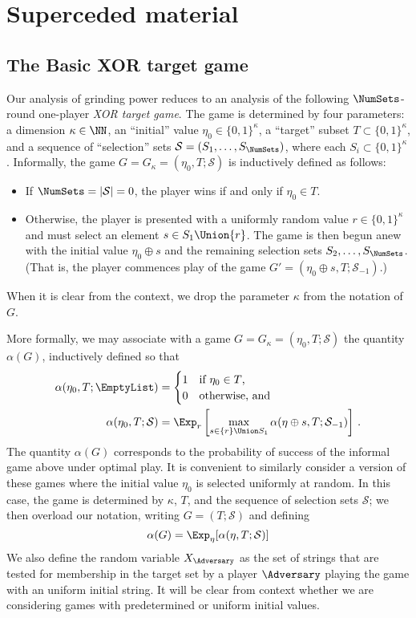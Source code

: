 
\section{Superceded material}


\subsection{The Basic XOR target game}\label{sec:generic-xor-game}


Our analysis of grinding power reduces to an analysis of the following
$\NumSets$-round one-player \emph{XOR target game}. 
The game is determined by four parameters: 
a dimension $\kappa \in \NN$, 
an ``initial'' value $\eta_0 \in \{0,1\}^\kappa$, 
a ``target'' subset $T \subset \{0,1\}^\kappa$, 
and a sequence of ``selection'' sets $\mathcal{S} = (S_1, \ldots, S_\NumSets)$, where each
$S_i \subset \{0,1\}^\kappa$. 
Informally, the game $G = G_\kappa = (\eta_0, T;  \mathcal{S})$ is
inductively defined as follows:
\begin{itemize}
\item If $\NumSets = |\mathcal{S}| = 0$, the player wins if and only if $\eta_0 \in T$.
\item Otherwise, the player is
  presented with a uniformly random value $r \in \{0,1\}^\kappa$ and must
  select an element $s \in S_1 \Union \{r\}$. The game is then
  begun anew with the initial value $\eta_0 \oplus s$ and the remaining
  selection sets $S_2, \ldots, S_\NumSets$. (That is, the player
  commences play of the game
  $G' = (\eta_0 \oplus s, T; \mathcal{S}_{-1})$.)
\end{itemize}
When it is clear from the context, we drop the parameter $\kappa$ from the notation of $G$.

More formally, we may associate with a game $G = G_\kappa = (\eta_0, T;  \mathcal{S})$ 
the quantity $\alpha(G)$, inductively defined so that
\begin{align*}
  \alpha(\eta_0, T;  \EmptyList) &= \begin{cases} 1 & \text{if $\eta_0 \in T$,}\\
    0 & \text{otherwise, and}
  \end{cases}\\
  \alpha(\eta_0, T;  \mathcal{S}) &= \Exp_r\left[
        \max_{s \in \{r\} \Union S_1} 
            \alpha(\eta \oplus s, T;  \mathcal{S}_{-1})
    \right]\,.  
\end{align*}
The quantity $\alpha(G)$ corresponds to the probability of success of
the informal game above under optimal play. It is convenient to
similarly consider a version of these games where the initial value
$\eta_0$ is selected uniformly at random. In this case, the game is
determined by $\kappa$, $T$, and the sequence of selection sets $\mathcal{S}$;
we then overload our notation, writing $G = (T;  \mathcal{S})$ and defining
\[
  \alpha(G) = \Exp_{\eta}[\alpha(\eta, T; \mathcal{S})]
\]
We also define the random variable $X_\Adversary$ as the set of strings 
that are tested for membership in the target set 
by a player $\Adversary$ playing the game with an uniform initial string.
It will be clear from context whether we are considering games with
predetermined or uniform initial values.

